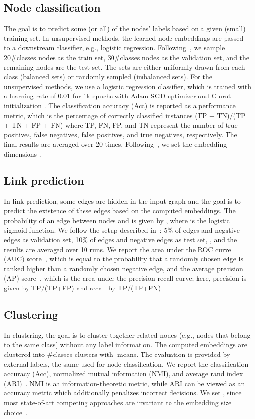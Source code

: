 \documentclass{article}
\begin{document}
\subsection{Node classification}
The goal is to predict some (or all) of the nodes' labels based on a given (small) training set. In unsupervised methods, the learned node embeddings are passed to a downstream classifier, e.g., logistic regression. Following~\cite{shchur2018pitfalls}, we sample 20\#classes nodes as the train set, 30\#classes nodes as the validation set, and the remaining nodes are the test set. The sets are either uniformly drawn from each class (balanced sets) or randomly sampled (imbalanced sets). For the unsupervised methods, we use a logistic regression classifier, which is trained with a learning rate of 0.01 for 1k epochs with Adam SGD optimizer \cite{kingma2014adam} and Glorot initialization \cite{glorot10a}. The classification accuracy (Acc) is reported as a performance metric, which is the percentage of correctly classified instances (TP + TN)/(TP + TN + FP + FN) where TP, FN, FP, and TN represent the number of true positives, false negatives, false positives, and true negatives, respectively. The final results are averaged over 20 times. Following~\cite{shchur2018pitfalls}, we set the embedding dimensions . 

\subsection{Link prediction}
In link prediction, some edges are hidden in the input graph and the goal is to predict the existence of these edges based on the computed embeddings. The probability of an edge between nodes  and  is given by , where  is the logistic sigmoid function. We follow the setup described in~\cite{kipf2016variational, pan2018adversarially}: 5\% of edges and negative edges as validation set, 10\% of edges and negative edges as test set, , and the results are averaged over 10 runs. We report the area under the ROC curve (AUC) score~\cite{bradley1997roc}, which is equal to the probability that a randomly chosen edge is ranked higher than a randomly chosen negative edge, and the average precision (AP) score~\cite{su2015ap}, which is the area under the precision-recall curve;  here, precision is given by TP/(TP+FP) and recall by  TP/(TP+FN).

\subsection{Clustering}
In clustering, the goal is to cluster together related nodes (e.g., nodes that belong to the same class) without any label information. The computed embeddings are clustered into  \#classes clusters with -means. The evaluation is provided by external labels, the same used for node classification.  We report the classification accuracy (Acc), normalized mutual information (NMI), and average rand index (ARI)~\cite{hubert1985comparing, manning2008information}. NMI is an information-theoretic metric, while ARI can be viewed as an accuracy metric which additionally penalizes incorrect decisions. We set , since most state-of-art competing approaches are invariant to the embedding size choice~\cite{pan2019learning}.
\end{document}
